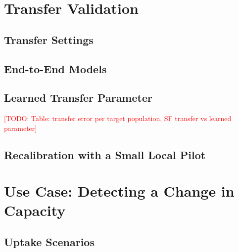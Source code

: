 \documentclass[9pt,journal,a4paper]{IEEEtran}
\newcommand{\todo}[1]{\textcolor{red}{[TODO: #1]}}
\begin{document}
\section{Transfer Validation}
\label{sec:transfer}

\subsection{Transfer Settings}

\subsection{End-to-End Models}

\subsection{Learned Transfer Parameter}
\todo{Table: transfer error per target population, SF transfer vs learned parameter}

\subsection{Recalibration with a Small Local Pilot}

\section{Use Case: Detecting a Change in Capacity}
\label{sec:usecase}

\subsection{Uptake Scenarios}
\end{document}
